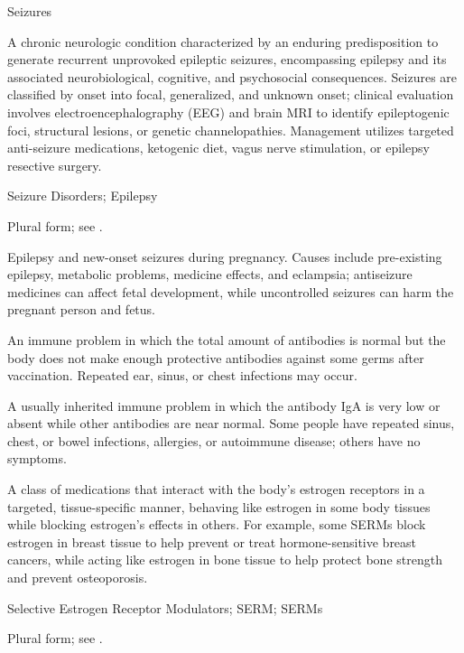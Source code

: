 \synonyms
Seizures

 A chronic neurologic condition characterized by an enduring predisposition to generate recurrent unprovoked epileptic seizures, encompassing epilepsy and its associated neurobiological, cognitive, and psychosocial consequences. Seizures are classified by onset into focal, generalized, and unknown onset; clinical evaluation involves electroencephalography (EEG) and brain MRI to identify epileptogenic foci, structural lesions, or genetic channelopathies. Management utilizes targeted anti-seizure medications, ketogenic diet, vagus nerve stimulation, or epilepsy resective surgery.

\synonyms
Seizure Disorders; Epilepsy

 Plural form; see .

 Epilepsy and new-onset seizures during pregnancy. Causes include pre-existing epilepsy, metabolic problems, medicine effects, and eclampsia; antiseizure medicines can affect fetal development, while uncontrolled seizures can harm the pregnant person and fetus.

 An immune problem in which the total amount of antibodies is normal but the body does not make enough protective antibodies against some germs after vaccination. Repeated ear, sinus, or chest infections may occur.

 A usually inherited immune problem in which the antibody IgA is very low or absent while other antibodies are near normal. Some people have repeated sinus, chest, or bowel infections, allergies, or autoimmune disease; others have no symptoms.

 A class of medications that interact with the body's estrogen receptors in a targeted, tissue-specific manner, behaving like estrogen in some body tissues while blocking estrogen's effects in others. For example, some SERMs block estrogen in breast tissue to help prevent or treat hormone-sensitive breast cancers, while acting like estrogen in bone tissue to help protect bone strength and prevent osteoporosis.

\synonyms
Selective Estrogen Receptor Modulators; SERM; SERMs

 Plural form; see .

